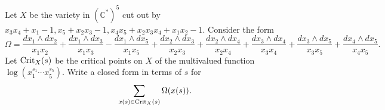 Let $X$ be the variety in $(\mathbb{C}^*)^5$ cut out by $x_3x_4 + x_1 - 1, x_5 + x_2x_3 - 1, x_4x_5 + x_2x_3x_4 + x_1x_2 - 1$. Consider the form
$$ \Omega=
\frac{dx_1 \wedge dx_2}{x_1 x_2}
+
\frac{dx_1 \wedge dx_3}{x_1 x_3}
-
\frac{dx_1 \wedge dx_5}{x_1 x_5}
+
\frac{dx_2 \wedge dx_3}{x_2 x_3}
+
\frac{dx_2 \wedge dx_4}{x_2 x_4}
+
\frac{dx_3 \wedge dx_4}{x_3 x_4}
+
\frac{dx_3 \wedge dx_5}{x_3 x_5}
+
\frac{dx_4 \wedge dx_5}{x_4 x_5}.
$$
Let ${\rm Crit}_X(s)$ be the critical points on $X$ of the multivalued function $\log(x_1^{s_1}\cdots x_5^{s_5})$. Write a closed form in terms of $s$ for
$$ \sum_{x(s) \in {\rm Crit}_X(s)} \Omega(x(s)).$$
